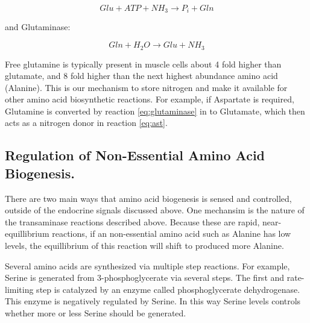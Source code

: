 \documentclass{tufte-handout}
\begin{document}
\begin{equation}
Glu + ATP +  NH_3 \rightarrow  P_i + Gln
\end{equation}

and Glutaminase:

\begin{equation}\label{eq:glutaminase} 
Gln + H_2O \rightarrow Glu + NH_3
\end{equation}

Free glutamine is typically present in muscle cells about 4 fold higher than glutamate, and 8 fold higher than the next highest abundance amino acid (Alanine).  This is our mechanism to store nitrogen and make it available for other amino acid biosynthetic reactions.  For example, if Aspartate is required, Glutamine is converted by reaction \ref{eq:glutaminase} in to Glutamate, which then acts as a nitrogen donor in reaction \ref{eq:ast}.

\subsection{Regulation of Non-Essential Amino Acid Biogenesis.}

There are two main ways that amino acid biogenesis is sensed and controlled, outside of the endocrine signals discussed above.  One mechansim is the nature of the transaminase reactions described above.  Because these are rapid, near-equillibrium reactions, if an non-essential amino acid such as Alanine has low levels, the equillibrium of this reaction will shift to produced more Alanine.

  Several amino acids are synthesized via multiple step reactions.  For example, Serine is generated from 3-phosphoglycerate via several steps.  The first and rate-limiting step is catalyzed by an enzyme called phosphoglycerate dehydrogenase.  This enzyme is negatively regulated by Serine.  In this way Serine levels controls whether more or less Serine should be generated.
\end{document}
